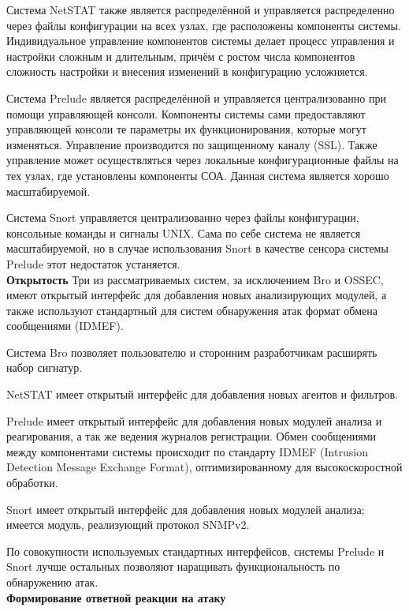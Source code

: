 Система NetSTAT также является распределённой и управляется распределенно
через файлы конфигурации на всех узлах, где расположены компоненты системы.
Индивидуальное управление компонентов системы делает процесс управления и
настройки сложным и длительным, причём с ростом числа компонентов сложность
настройки и внесения изменений в конфигурацию усложняется.

Система Prelude является распределённой и управляется централизованно при
помощи управляющей консоли. Компоненты системы сами предоставляют
управляющей консоли те параметры их функционирования, которые могут изменяться.
Управление производится по защищенному каналу (SSL). Также управление может
осуществляться через локальные конфигурационные файлы на тех узлах, где
установлены компоненты СОА. Данная система является хорошо масштабируемой.

Система Snort управляется централизованно через файлы конфигурации,
консольные команды и сигналы UNIX. Сама по себе система не является
масштабируемой, но в случае использования Snort в качестве сенсора системы Prelude этот недостаток устаняется.\\

\textbf{Открытость}
Три из рассматриваемых систем, за исключением Bro и OSSEC, имеют открытый
интерфейс для добавления новых анализирующих модулей, а также используют
стандартный для систем обнаружения атак формат обмена сообщениями (IDMEF).

Система Bro позволяет пользователю и сторонним разработчикам расширять набор
сигнатур.

NetSTAT имеет открытый интерфейс для добавления новых агентов и фильтров.

Prelude имеет открытый интерфейс для добавления новых модулей анализа и
реагирования, а так же ведения журналов регистрации. Обмен сообщениями между
компонентами системы происходит по стандарту IDMEF (Intrusion Detection Message
Exchange Format), оптимизированному для высокоскоростной обработки.

Snort имеет открытый интерфейс для добавления новых модулей анализа; имеется
модуль, реализующий протокол SNMPv2.

По совокупности используемых стандартных интерфейсов, системы Prelude и Snort
лучше остальных позволяют наращивать функциональность по обнаружению атак.\\

\textbf{Формирование ответной реакции на атаку}

